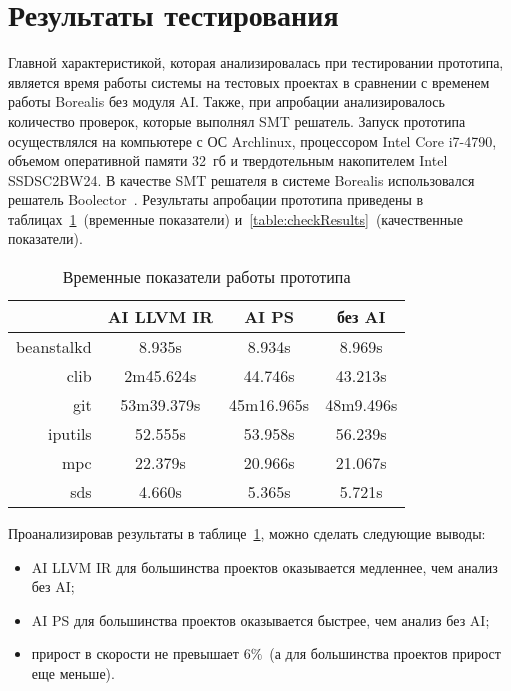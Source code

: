 \section{Результаты тестирования}
Главной характеристикой, которая анализировалась при тестировании прототипа, 
является время работы системы на тестовых проектах в сравнении с временем
работы Borealis без модуля AI. Также, при апробации анализировалось количество 
проверок, которые выполнял SMT решатель. Запуск прототипа осуществлялся на 
компьютере с ОС Archlinux, процессором Intel Core i7-4790, объемом оперативной 
памяти 32~гб и твердотельным накопителем Intel SSDSC2BW24. В качестве SMT 
решателя в системе Borealis использовался решатель Boolector~\cite{boolector}. 
Результаты апробации прототипа приведены в 
таблицах~\ref{table:timeResults}~(временные показатели) 
и~\ref{table:checkResults}~(качественные показатели).
\begin{table}
\captionsetup{skip=5pt}
\caption{Временные показатели работы прототипа}
\centering
\begin{tabular}{|r|c|c|c|}
\hline
           & AI LLVM IR   & AI PS        & без AI    \\ \hline
beanstalkd & 8.935s       & 8.934s       & 8.969s    \\ \hline
clib       & 2m45.624s    & 44.746s      & 43.213s   \\ \hline
git        & 53m39.379s   & 45m16.965s   & 48m9.496s \\ \hline
iputils    & 52.555s      & 53.958s      & 56.239s   \\ \hline
mpc        & 22.379s      & 20.966s      & 21.067s   \\ \hline
sds        & 4.660s       & 5.365s       & 5.721s    \\ \hline
\end{tabular}
\label{table:timeResults}
\end{table}

Проанализировав результаты в таблице~\ref{table:timeResults}, можно сделать 
следующие выводы:
\begin{itemize}
\item AI LLVM IR для большинства проектов оказывается медленнее, чем
анализ без AI;
\item AI PS для большинства проектов оказывается быстрее, чем анализ
без AI;
\item прирост в скорости не превышает $6\%$~(а для большинства проектов прирост
еще меньше).
\end{itemize}


